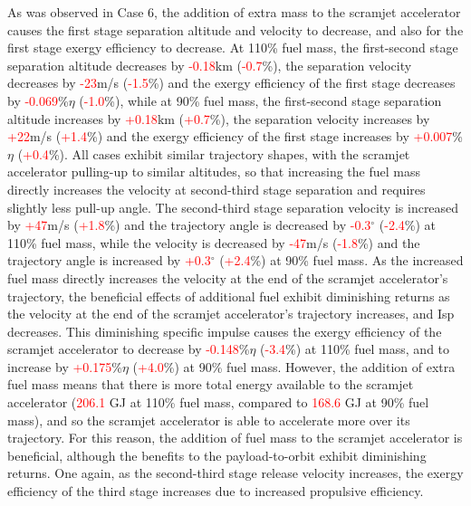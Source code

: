  As was observed in Case 6, the addition of extra mass to the scramjet accelerator causes the first stage separation altitude and velocity to decrease, and also for the first stage exergy efficiency to decrease. At 110\% fuel mass, the first-second stage separation altitude decreases by \textcolor{red}{-0.18}km (\textcolor{red}{-0.7}\%), the separation velocity decreases by \textcolor{red}{-23}m/s (\textcolor{red}{-1.5}\%) and the exergy efficiency of the first stage decreases by \textcolor{red}{-0.069}\%$\eta$ (\textcolor{red}{-1.0}\%), while at 90\% fuel mass, the first-second stage separation altitude increases by \textcolor{red}{+0.18}km (\textcolor{red}{+0.7}\%), the separation velocity increases by \textcolor{red}{+22}m/s (\textcolor{red}{+1.4}\%) and the exergy efficiency of the first stage increases by \textcolor{red}{+0.007}\%$\eta$ (\textcolor{red}{+0.4}\%).
All cases exhibit similar trajectory shapes, with the scramjet accelerator pulling-up to similar altitudes, so that increasing the fuel mass directly increases the velocity at second-third stage separation and requires slightly less pull-up angle. The second-third stage separation velocity is increased by \textcolor{red}{+47}m/s (\textcolor{red}{+1.8}\%) and the trajectory angle is decreased by \textcolor{red}{-0.3}$^\circ$ (\textcolor{red}{-2.4}\%) at 110\% fuel mass, while the velocity is decreased by \textcolor{red}{-47}m/s (\textcolor{red}{-1.8}\%) and the trajectory angle is increased by \textcolor{red}{+0.3}$^\circ$ (\textcolor{red}{+2.4}\%) at 90\% fuel mass. 
As the increased fuel mass directly increases the velocity at the end of the scramjet accelerator's trajectory, the beneficial effects of additional fuel exhibit diminishing returns as the velocity at the end of the scramjet accelerator's trajectory increases, and Isp decreases.
This diminishing specific impulse causes the exergy efficiency of the scramjet accelerator to decrease by \textcolor{red}{-0.148}\%$\eta$ (\textcolor{red}{-3.4}\%) at 110\% fuel mass, and to increase by \textcolor{red}{+0.175}\%$\eta$ (\textcolor{red}{+4.0}\%) at 90\% fuel mass. 
However, the addition of extra fuel mass means that there is more total energy available to the scramjet accelerator (\textcolor{red}{206.1} GJ at 110\% fuel mass, compared to \textcolor{red}{168.6} GJ at 90\% fuel mass), and so the scramjet accelerator is able to accelerate more over its trajectory. For this reason, the addition of fuel mass to the scramjet accelerator is beneficial, although the benefits to the payload-to-orbit exhibit diminishing returns. 
One again, as the second-third stage release velocity increases, the exergy efficiency of the third stage increases due to increased propulsive efficiency. 


